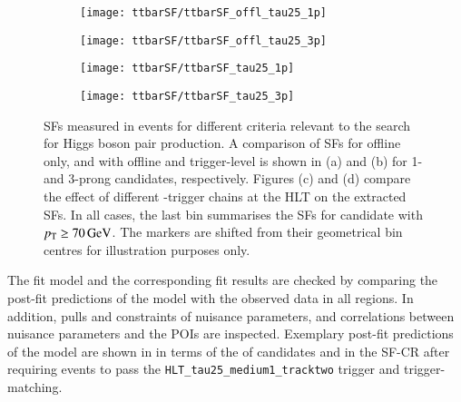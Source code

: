 \begin{figure}[htbp]
  \centering

  \begin{subfigure}[t]{.495\textwidth}
    \texttt{[image: ttbarSF/ttbarSF\_offl\_tau25\_1p]}
    \caption{}
    \label{fig:ttbarSF_postfit_SF_a}
  \end{subfigure}\hfill%
  \begin{subfigure}[t]{.495\textwidth}
    \texttt{[image: ttbarSF/ttbarSF\_offl\_tau25\_3p]}
    \caption{}
    \label{fig:ttbarSF_postfit_SF_b}
  \end{subfigure}

  \begin{subfigure}[t]{.495\textwidth}
    \texttt{[image: ttbarSF/ttbarSF\_tau25\_1p]}
    \caption{}
    \label{fig:ttbarSF_postfit_SF_c}
  \end{subfigure}\hfill%
  \begin{subfigure}[t]{.495\textwidth}
    \texttt{[image: ttbarSF/ttbarSF\_tau25\_3p]}
    \caption{}
    \label{fig:ttbarSF_postfit_SF_d}
  \end{subfigure}

  \caption{\Faketauhadvis SFs measured in \ttbar events for different \tauid
    criteria relevant to the search for Higgs boson pair production. A
    comparison of \faketauhadvis SFs for offline \tauid only, and with offline
    and trigger-level \tauid is shown in (a) and (b) for 1- and 3-prong
    \tauhadvis candidates, respectively. Figures (c) and (d) compare the effect
    of different \tauhadvis-trigger chains at the HLT on the extracted SFs. In
    all cases, the last bin summarises the SFs for \tauhadvis candidate with
    $\pT \geq \SI{70}{\GeV}$. The markers are shifted from their geometrical bin
    centres for illustration purposes only.}%
  \label{fig:ttbarSF_postfit_SF}
\end{figure}

The fit model and the corresponding fit results are checked by comparing the
post-fit predictions of the model with the observed data in all regions. In
addition, pulls and constraints of nuisance parameters, and correlations between
nuisance parameters and the POIs are inspected. Exemplary post-fit predictions
of the model are shown in  in terms of the \pT
of \tauhadvis candidates and \mTW in the SF-CR after requiring events to pass
the \texttt{HLT\_tau25\_medium1\_tracktwo} trigger and trigger-matching.

